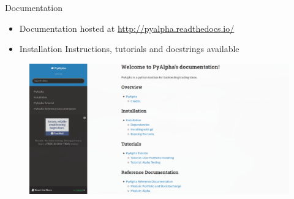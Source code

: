 \documentclass[serif,mathserif]{beamer}
\begin{document}
    \begin{frame}{Documentation}

        \begin{itemize}
            \item Documentation hosted at \url{http://pyalpha.readthedocs.io/}
            \item Installation Instructions, tutorials and docstrings available
        \end{itemize}

        \begin{figure}
            \centering
            \includegraphics[width = \linewidth]{docs.png}
        \end{figure}


    \end{frame}
\end{document}
